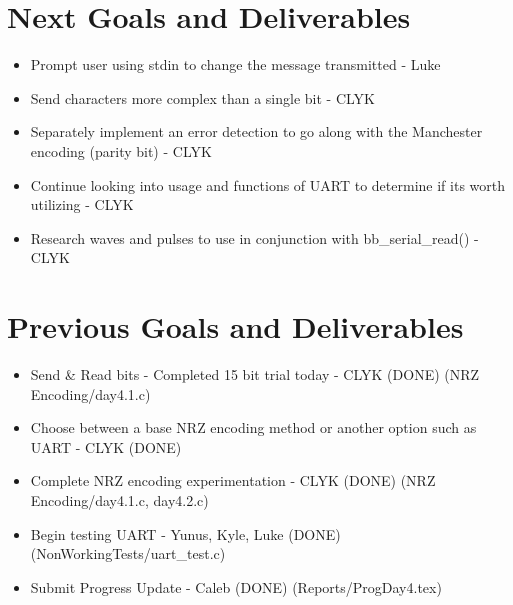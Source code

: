 \documentclass{article}
\begin{document}
\section*{Next Goals and Deliverables}
\begin{itemize}
\item Prompt user using stdin to change the message transmitted - Luke
\item Send characters more complex than a single bit - CLYK
\item Separately implement an error detection to go along with the Manchester encoding (parity bit) - CLYK
\item Continue looking into usage and functions of UART to determine if its worth utilizing - CLYK
\item Research waves and pulses to use in conjunction with bb\_serial\_read() - CLYK

\end{itemize}
\section*{Previous Goals and Deliverables}
\begin{itemize}
\item Send \& Read bits - Completed 15 bit trial today - CLYK (DONE) (NRZ Encoding/day4.1.c)
\item Choose between a base NRZ encoding method or another option such as UART - CLYK (DONE)
\item Complete NRZ encoding experimentation - CLYK (DONE) (NRZ Encoding/day4.1.c, day4.2.c)
\item Begin testing UART - Yunus, Kyle, Luke (DONE) (NonWorkingTests/uart\_test.c)
\item Submit Progress Update - Caleb (DONE) (Reports/ProgDay4.tex)
\end{itemize}
\end{document}
